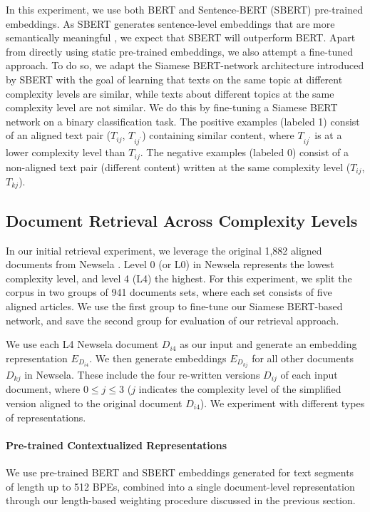 \documentclass[thesis.tex]{subfiles}
\begin{document}
In this experiment, we use both BERT \citep{devlin2019bert} and Sentence-BERT (SBERT) \citep{reimers2019sentence} pre-trained embeddings. As SBERT generates sentence-level embeddings that are more semantically meaningful \citep{reimers2019sentence}, we expect that SBERT will outperform BERT. Apart from directly using static pre-trained embeddings, we also attempt a fine-tuned approach. To do so, we adapt the Siamese BERT-network architecture introduced by SBERT \citep{reimers2019sentence} with the goal of learning that texts on the same topic at different complexity levels are similar, while texts about different topics at the same complexity level are not similar. We do this by fine-tuning a Siamese BERT network on a binary classification task. The positive examples (labeled 1) consist of an aligned text pair ($T_{ij}$, $T_{ij^{\prime}}$) containing similar content, where $T_{ij^{\prime}}$ is at a lower complexity level than $T_{ij}$. The negative examples (labeled 0) consist of a non-aligned text pair (different content) written at the same complexity level ($T_{ij}$, $T_{kj}$).

\subsection{Document Retrieval Across Complexity Levels} \label{sec:ir_newsela}

In our initial retrieval experiment, we leverage the original 1,882 aligned documents from Newsela \citep{xu2015problems}. Level 0 (or L0) in Newsela represents the lowest complexity level, and level 4 (L4) the highest. For this experiment, we split the corpus in two groups of 941 documents sets, where each set consists of five aligned articles. We use the first group to fine-tune our Siamese BERT-based network, and save the second group for evaluation of our retrieval approach.

We use each L4 Newsela document $D_{i4}$ as our input and generate an embedding representation $E_{D_{i4}}$.  We then generate embeddings $E_{D_{kj}}$ for all other documents $D_{kj}$ in Newsela. These include the four re-written versions $D_{ij}$ of each input document, where $0 \leq j \leq 3$ ($j$ indicates the complexity level of the simplified version aligned to the original document $D_{i4}$). We experiment with different types of representations.

\paragraph {\bf Pre-trained Contextualized Representations}
We use pre-trained BERT and SBERT embeddings generated for text segments of length up to 512 BPEs, combined into a single document-level representation through our length-based weighting procedure discussed in the previous section.
\end{document}
